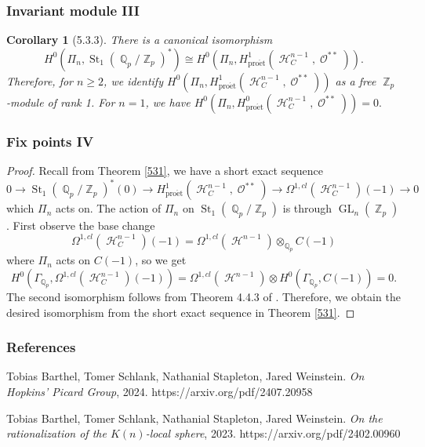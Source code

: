 \documentclass{beamer}
\newtheorem{cor}[thm]{Corollary}
\theoremstyle{definition}
\newcommand{\pet}{\operatorname{pro\acute{e}t}}
\newcommand{\St}{\operatorname{St}}
\newcommand{\GL}{\operatorname{GL}}
\newcommand{\OO}{\operatorname{\mathcal{O}}}
\newcommand{\ZZ}{\operatorname{\mathbb{Z}}}
\newcommand{\QQ}{\operatorname{\mathbb{Q}}}
\newcommand{\HH}{\operatorname{\mathcal{H}}}
\begin{document}
\begin{frame}
\frametitle{Invariant module III}
\begin{cor}[5.3.3]
	There is a canonical isomorphism $$H^0(\Pi_n, \St_1(\QQ_p/\ZZ_p)^*) \cong H^0(\Pi_n, H^1_{\pet}(\HH_C^{n - 1}, \OO^{**})).$$ Therefore, for $n \geq 2$, we identify $H^0(\Pi_n, H^1_{\pet}(\HH_C^{n - 1}, \OO^{**}))$ as a free $\ZZ_p$-module of rank 1. For $n = 1$, we have $H^0(\Pi_n, H^0_{\pet}(\HH_C^{n - 1}, \OO^{**})) = 0.$
\end{cor}
\end{frame}

\begin{frame}%
\frametitle{Fix points IV}
\begin{proof}
Recall from Theorem \ref{531}, we have a short exact sequence $$0 \to \St_1(\QQ_p/\ZZ_p)^*(0) \to H^1_{\pet}(\HH_C^{n - 1}, \OO^{**}) \to \Omega^{1, cl}(\HH_C^{n - 1})(-1) \to 0$$ which $\Pi_n$ acts on. The action of $\Pi_n$ on $\St_1(\QQ_p/\ZZ_p)$ is through $\GL_n(\ZZ_p)$. First observe the base change $$\Omega^{1, cl}(\HH^{n - 1}_C)(-1) = \Omega^{1, cl}(\HH^{n - 1}) \otimes_{\QQ_p}C(-1)$$ where $\Pi_n$ acts on $C(-1)$, so we get $$H^0(\Gamma_{\QQ_p}, \Omega^{1, cl}(\HH^{n - 1}_C)(-1)) = \Omega^{1, cl}(\HH^{n - 1}) \otimes H^0(\Gamma_{\QQ_p}, C(-1)) = 0.$$ The second isomorphism follows from Theorem 4.4.3 of \cite{23}. Therefore, we obtain the desired isomorphism from the short exact sequence in Theorem \ref{531}. \end{proof}
\end{frame}


\begin{frame}
\frametitle{References}
\begin{thebibliography}{999}

	Tobias Barthel, Tomer Schlank, Nathanial Stapleton, Jared Weinstein.
  \emph{On Hopkins' Picard Group}, 2024.
	https://arxiv.org/pdf/2407.20958
  
	Tobias Barthel, Tomer Schlank, Nathanial Stapleton, Jared Weinstein.
  \emph{On the rationalization of the $K(n)$-local sphere}, 2023.
  	https://arxiv.org/pdf/2402.00960

\end{thebibliography}
	
\end{frame}
\end{document}
